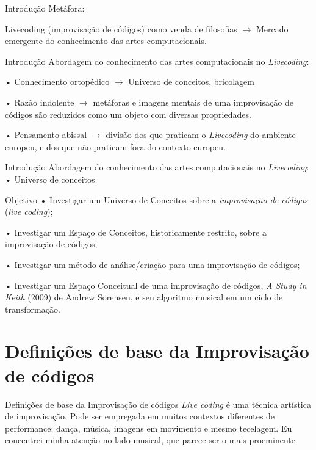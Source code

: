 \documentclass[aspectratio=169]{beamer}
\begin{document}
\begin{frame}{Introdução}
Metáfora:

Livecoding (improvisação de códigos) como venda de filosofias $\rightarrow$ Mercado emergente do conhecimento das artes computacionais.
\end{frame}

\begin{frame}{Introdução}
Abordagem do conhecimento das artes computacionais no \emph{Livecoding}:

• Conhecimento ortopédico $\rightarrow$ Universo de conceitos, bricolagem

• Razão indolente $\rightarrow$ metáforas e imagens mentais de uma improvisação de códigos são reduzidos como um objeto com diversas propriedades.

• Pensamento abissal $\rightarrow$ divisão dos que praticam o \emph{Livecoding} do ambiente europeu, e dos que não praticam fora do contexto europeu.
\end{frame}

\begin{frame}{Introdução}
Abordagem do conhecimento das artes computacionais no \emph{Livecoding}:
• Universo de conceitos
\end{frame}

\begin{frame}{Objetivo}
• Investigar um Universo de Conceitos sobre a \emph{improvisação de códigos} (\emph{live coding});

• Investigar um Espaço de Conceitos, historicamente restrito, sobre a improvisação de códigos;

• Investigar um método de análise/criação para uma improvisação de códigos;

• Investigar um Espaço Conceitual de uma improvisação de códigos, \emph{A Study in Keith} (2009) de Andrew Sorensen, e seu algoritmo musical em um ciclo de transformação.
\end{frame}

\section{Definições de base da Improvisação de códigos}
\begin{frame}{Definições de base da Improvisação de códigos}
\emph{Live coding} é uma técnica artística de improvisação. Pode ser empregada em muitos contextos diferentes de performance: dança, música, imagens em movimento e mesmo tecelagem. Eu concentrei minha atenção no lado musical, que parece ser o mais proeminente \cite[p.~117]{mori_analysing_2015}
\end{frame}
\end{document}
